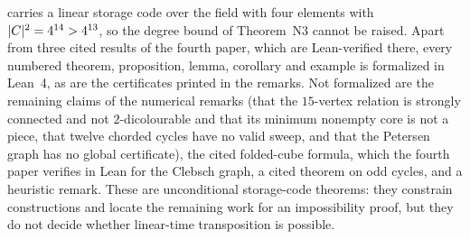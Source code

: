 carries a linear storage code over the field with four elements with $\lvert C \rvert^2=4^{14}>4^{13}$, so the degree bound of
Theorem~N3 cannot be raised. Apart from three cited results of the fourth paper, which are Lean-verified there, every numbered theorem,
proposition, lemma, corollary and example is formalized in Lean~4, as are the certificates printed in the remarks. Not
formalized are the remaining claims of the numerical remarks (that the $15$-vertex relation is strongly connected and not
$2$-dicolourable and that its minimum nonempty core is not a piece, that twelve chorded cycles have no valid sweep, and
that the Petersen graph has no global certificate), the cited folded-cube formula, which the fourth paper verifies in
Lean for the Clebsch graph, a cited theorem on odd cycles, and a heuristic remark. These are unconditional storage-code theorems: they constrain
constructions and locate the remaining work for an impossibility proof, but they do not decide whether linear-time
transposition is possible.
